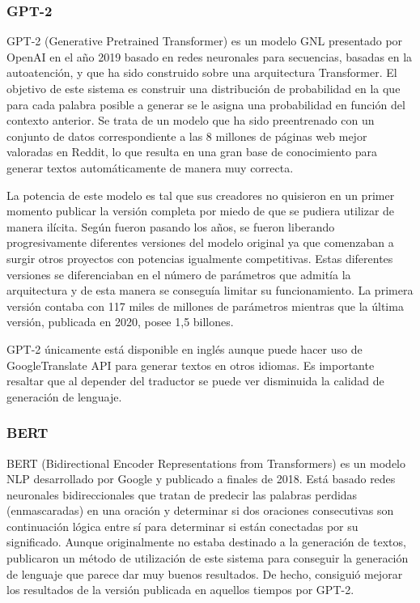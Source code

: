 \subsubsection{GPT-2}
GPT-2 (Generative Pretrained Transformer) es un modelo GNL presentado por OpenAI en el año 2019 basado en redes neuronales para secuencias, basadas en la autoatención, y que ha sido construido sobre una arquitectura Transformer. El objetivo de este sistema es construir una distribución de probabilidad en la que para cada palabra posible a generar se le asigna una probabilidad en función del contexto anterior. Se trata de un modelo que ha sido preentrenado con un conjunto de datos correspondiente a las 8 millones de páginas web mejor valoradas en Reddit, lo que resulta en una gran base de conocimiento para generar textos automáticamente de manera muy correcta.

La potencia de este modelo es tal que sus creadores no quisieron en un primer momento publicar la versión completa por miedo de que se pudiera utilizar de manera ilícita. Según fueron pasando los años, se fueron liberando progresivamente diferentes versiones del modelo original ya que comenzaban a surgir otros proyectos con potencias igualmente competitivas. Estas diferentes versiones se diferenciaban en el número de parámetros que admitía la arquitectura y de esta manera se conseguía limitar su funcionamiento. La primera versión contaba con 117 miles de millones de parámetros mientras que la última versión, publicada en 2020, posee 1,5 billones.

GPT-2 únicamente está disponible en inglés aunque puede hacer uso de GoogleTranslate API para generar textos en otros idiomas. Es importante resaltar que al depender del traductor se puede ver disminuida la calidad de generación de lenguaje.

\subsubsection{BERT}
BERT (Bidirectional Encoder Representations from Transformers) es un modelo NLP desarrollado por Google y publicado a finales de 2018. Está basado redes neuronales bidireccionales que tratan de predecir las palabras perdidas (enmascaradas) en una oración y determinar si dos oraciones consecutivas son continuación lógica entre sí para determinar si están conectadas por su significado. Aunque originalmente no estaba destinado a la generación de textos, \cite{wang-cho-2019-bert} publicaron un método de utilización de este sistema para conseguir la generación de lenguaje que parece dar muy buenos resultados. De hecho, consiguió mejorar los resultados de la versión publicada en aquellos tiempos por GPT-2. 


